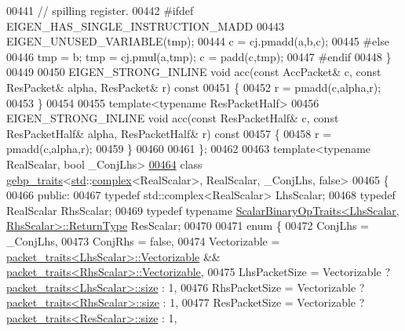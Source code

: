 \begin{DoxyCode}
00441     \textcolor{comment}{// spilling register.}
00442 \textcolor{preprocessor}{#ifdef EIGEN\_HAS\_SINGLE\_INSTRUCTION\_MADD}
00443     EIGEN\_UNUSED\_VARIABLE(tmp);
00444     c = cj.pmadd(a,b,c);
00445 \textcolor{preprocessor}{#else}
00446     tmp = b; tmp = cj.pmul(a,tmp); c = padd(c,tmp);
00447 \textcolor{preprocessor}{#endif}
00448   \}
00449 
00450   EIGEN\_STRONG\_INLINE \textcolor{keywordtype}{void} acc(\textcolor{keyword}{const} AccPacket& c, \textcolor{keyword}{const} ResPacket& alpha, ResPacket& r)\textcolor{keyword}{ const}
00451 \textcolor{keyword}{  }\{
00452     r = pmadd(c,alpha,r);
00453   \}
00454   
00455   \textcolor{keyword}{template}<\textcolor{keyword}{typename} ResPacketHalf>
00456   EIGEN\_STRONG\_INLINE \textcolor{keywordtype}{void} acc(\textcolor{keyword}{const} ResPacketHalf& c, \textcolor{keyword}{const} ResPacketHalf& alpha, ResPacketHalf& r)\textcolor{keyword}{ const}
00457 \textcolor{keyword}{  }\{
00458     r = pmadd(c,alpha,r);
00459   \}
00460 
00461 \};
00462 
00463 \textcolor{keyword}{template}<\textcolor{keyword}{typename} RealScalar, \textcolor{keywordtype}{bool} \_ConjLhs>
\hyperlink{class_eigen_1_1internal_1_1gebp__traits_3_01std_1_1complex_3_01_real_scalar_01_4_00_01_real_scald728c008ac4da8a5a1327d1e06be8c1f}{00464} \textcolor{keyword}{class }\hyperlink{class_eigen_1_1internal_1_1gebp__traits}{gebp\_traits}<\hyperlink{namespacestd}{std}::\hyperlink{structcomplex}{complex}<RealScalar>, RealScalar, \_ConjLhs, false>
00465 \{
00466 \textcolor{keyword}{public}:
00467   \textcolor{keyword}{typedef} std::complex<RealScalar> LhsScalar;
00468   \textcolor{keyword}{typedef} RealScalar RhsScalar;
00469   \textcolor{keyword}{typedef} \textcolor{keyword}{typename} \hyperlink{group___core___module_struct_eigen_1_1_scalar_binary_op_traits}{ScalarBinaryOpTraits<LhsScalar, RhsScalar>::ReturnType}
       ResScalar;
00470 
00471   \textcolor{keyword}{enum} \{
00472     ConjLhs = \_ConjLhs,
00473     ConjRhs = \textcolor{keyword}{false},
00474     Vectorizable = \hyperlink{struct_eigen_1_1internal_1_1packet__traits}{packet\_traits<LhsScalar>::Vectorizable} && 
      \hyperlink{struct_eigen_1_1internal_1_1packet__traits}{packet\_traits<RhsScalar>::Vectorizable},
00475     LhsPacketSize = Vectorizable ? \hyperlink{struct_eigen_1_1internal_1_1packet__traits}{packet\_traits<LhsScalar>::size} : 1,
00476     RhsPacketSize = Vectorizable ? \hyperlink{struct_eigen_1_1internal_1_1packet__traits}{packet\_traits<RhsScalar>::size} : 1,
00477     ResPacketSize = Vectorizable ? \hyperlink{struct_eigen_1_1internal_1_1packet__traits}{packet\_traits<ResScalar>::size} : 1,

\end{DoxyCode}
